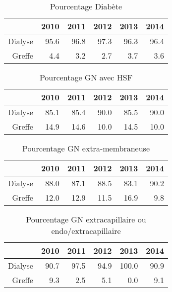 \documentclass[11pt,a4paper]{article}\usepackage[]{graphicx}\usepackage[]{color}
\begin{document}
\begin{table}[H]
\centering
\begin{tabular}{rrrrrr}
  \hline
 & 2010 & 2011 & 2012 & 2013 & 2014 \\ 
  \hline
Dialyse & 95.6 & 96.8 & 97.3 & 96.3 & 96.4 \\ 
  Greffe & 4.4 & 3.2 & 2.7 & 3.7 & 3.6 \\ 
   \hline
\end{tabular}
\caption{Pourcentage Diabète} 
\end{table}
\begin{table}[H]
\centering
\begin{tabular}{rrrrrr}
  \hline
 & 2010 & 2011 & 2012 & 2013 & 2014 \\ 
  \hline
Dialyse & 85.1 & 85.4 & 90.0 & 85.5 & 90.0 \\ 
  Greffe & 14.9 & 14.6 & 10.0 & 14.5 & 10.0 \\ 
   \hline
\end{tabular}
\caption{Pourcentage GN avec HSF} 
\end{table}
\begin{table}[H]
\centering
\begin{tabular}{rrrrrr}
  \hline
 & 2010 & 2011 & 2012 & 2013 & 2014 \\ 
  \hline
Dialyse & 88.0 & 87.1 & 88.5 & 83.1 & 90.2 \\ 
  Greffe & 12.0 & 12.9 & 11.5 & 16.9 & 9.8 \\ 
   \hline
\end{tabular}
\caption{Pourcentage GN extra-membraneuse} 
\end{table}
\begin{table}[H]
\centering
\begin{tabular}{rrrrrr}
  \hline
 & 2010 & 2011 & 2012 & 2013 & 2014 \\ 
  \hline
Dialyse & 90.7 & 97.5 & 94.9 & 100.0 & 90.9 \\ 
  Greffe & 9.3 & 2.5 & 5.1 & 0.0 & 9.1 \\ 
   \hline
\end{tabular}
\caption{Pourcentage GN extracapillaire ou endo/extracapillaire} 
\end{table}
\end{document}
